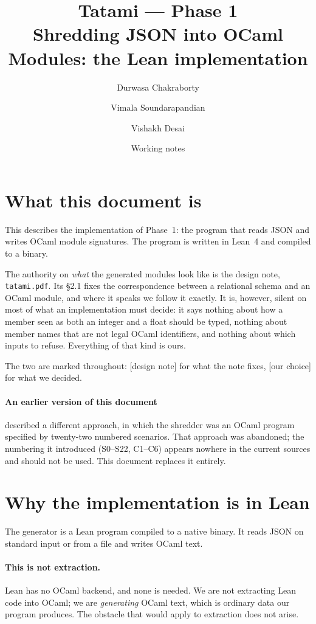 \documentclass[11pt,a4paper]{article}
\title{\textbf{Tatami --- Phase 1}\\[0.3em]
       \large Shredding JSON into OCaml Modules: the Lean implementation}
\author{Durwasa Chakraborty \and Vimala Soundarapandian \and Vishakh Desai}
\date{Working notes}
\newcommand{\fromnote}{\textcolor{note}{\textsf{[design note]}}}
\newcommand{\ourcall}{\textcolor{ours}{\textsf{[our choice]}}}
\begin{document}
\maketitle

\section{What this document is}

This describes the implementation of Phase~1: the program that reads JSON and
writes OCaml module signatures. The program is written in Lean~4 and compiled
to a binary.

The authority on \emph{what} the generated modules look like is the design
note, \texttt{tatami.pdf}. Its \S2.1 fixes the correspondence between a
relational schema and an OCaml module, and where it speaks we follow it
exactly. It is, however, silent on most of what an implementation must decide:
it says nothing about how a member seen as both an integer and a float should
be typed, nothing about member names that are not legal OCaml identifiers, and
nothing about which inputs to refuse. Everything of that kind is ours.

The two are marked throughout: \fromnote{} for what the note fixes, \ourcall{}
for what we decided.

\paragraph{An earlier version of this document} described a different
approach, in which the shredder was an OCaml program specified by
twenty-two numbered scenarios. That approach was abandoned; the numbering it
introduced (S0--S22, C1--C6) appears nowhere in the current sources and should
not be used. This document replaces it entirely.

\section{Why the implementation is in Lean}

The generator is a Lean program compiled to a native binary. It reads JSON on
standard input or from a file and writes OCaml text.

\paragraph{This is not extraction.} Lean has no OCaml backend, and none is
needed. We are not extracting Lean code into OCaml; we are \emph{generating}
OCaml text, which is ordinary data our program produces. The obstacle that
would apply to extraction does not arise.
\end{document}

